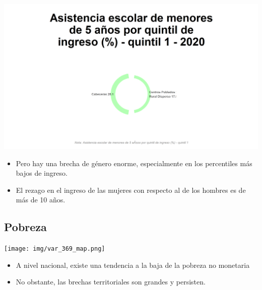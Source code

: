 \documentclass[aspectratio=169]{beamer}
\begin{document}
    \begin{slide}{3} 
                      \begin{imagecolumn}
                \includegraphics[width=\columnwidth]{img/var_102_static.png}
            \end{imagecolumn}
            \begin{textcolumn}
                \begin{itemize}
                    \item Pero hay una brecha de género enorme, especialmente en los percentiles más bajos de ingreso.
                    \item El rezago en el ingreso de las mujeres con respecto al de los hombres es de más de 10 años.
                \end{itemize}
            \end{textcolumn}

    \printcolumns
    \end{slide}

    
    \subsection{Pobreza}
    
    \begin{slide}{4} 
                      \begin{imagecolumn}
                \texttt{[image: img/var\_369\_map.png]}
            \end{imagecolumn}
            \begin{textcolumn}
                \begin{itemize}
                    \item A nivel nacional, existe una tendencia a la baja de la pobreza no monetaria
                    \item No obstante, las brechas territoriales son grandes y persisten.
                \end{itemize}
            \end{textcolumn}

    \printcolumns
    \end{slide}
     
\end{document}
